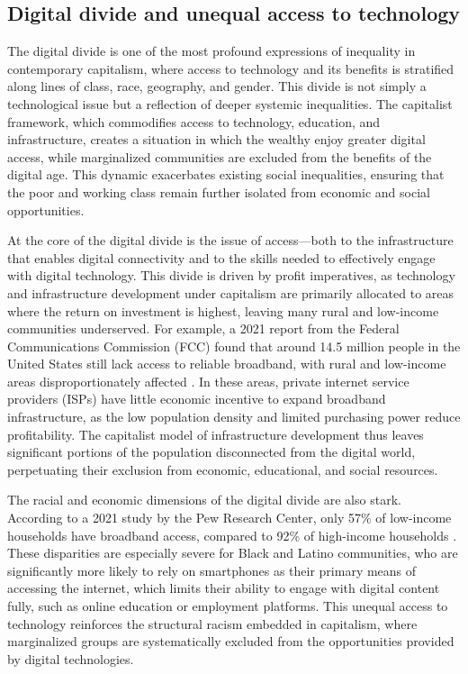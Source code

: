 \begin{refsection}
\subsection{Digital divide and unequal access to technology}

The digital divide is one of the most profound expressions of inequality in contemporary capitalism, where access to technology and its benefits is stratified along lines of class, race, geography, and gender. This divide is not simply a technological issue but a reflection of deeper systemic inequalities. The capitalist framework, which commodifies access to technology, education, and infrastructure, creates a situation in which the wealthy enjoy greater digital access, while marginalized communities are excluded from the benefits of the digital age. This dynamic exacerbates existing social inequalities, ensuring that the poor and working class remain further isolated from economic and social opportunities.

At the core of the digital divide is the issue of access—both to the infrastructure that enables digital connectivity and to the skills needed to effectively engage with digital technology. This divide is driven by profit imperatives, as technology and infrastructure development under capitalism are primarily allocated to areas where the return on investment is highest, leaving many rural and low-income communities underserved. For example, a 2021 report from the Federal Communications Commission (FCC) found that around 14.5 million people in the United States still lack access to reliable broadband, with rural and low-income areas disproportionately affected \cite[pp.~23-25]{fcc2021}. In these areas, private internet service providers (ISPs) have little economic incentive to expand broadband infrastructure, as the low population density and limited purchasing power reduce profitability. The capitalist model of infrastructure development thus leaves significant portions of the population disconnected from the digital world, perpetuating their exclusion from economic, educational, and social resources.

The racial and economic dimensions of the digital divide are also stark. According to a 2021 study by the Pew Research Center, only 57\% of low-income households have broadband access, compared to 92\% of high-income households \cite[pp.~38-40]{pew2021}. These disparities are especially severe for Black and Latino communities, who are significantly more likely to rely on smartphones as their primary means of accessing the internet, which limits their ability to engage with digital content fully, such as online education or employment platforms. This unequal access to technology reinforces the structural racism embedded in capitalism, where marginalized groups are systematically excluded from the opportunities provided by digital technologies.


\end{refsection}
